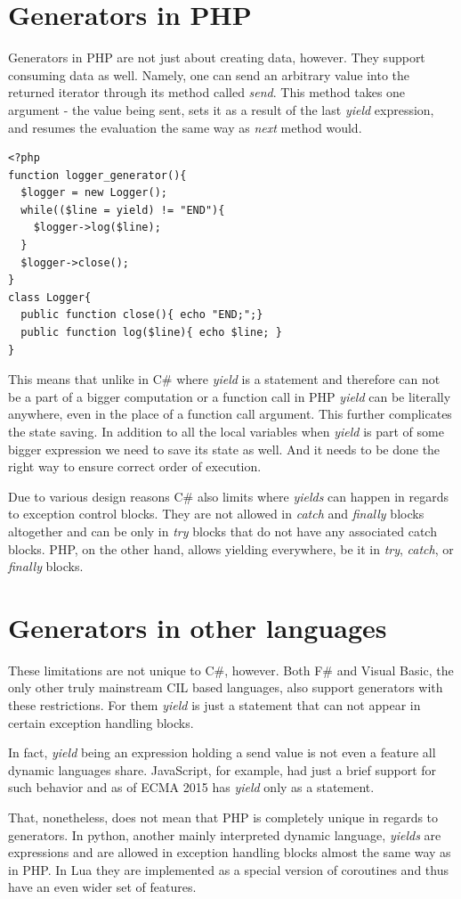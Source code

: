 \section{Generators in PHP}

Generators in PHP are not just about creating data, however. They support consuming data as well. Namely, one can send an arbitrary value into the returned iterator through its method called \emph{send}. This method takes one argument - the value being sent, sets it as a result of the last \emph{yield} expression, and resumes the evaluation the same way as \emph{next} method would.

\begin{verbatim}
<?php
function logger_generator(){
  $logger = new Logger();
  while(($line = yield) != "END"){
    $logger->log($line);
  }
  $logger->close();
}
class Logger{
  public function close(){ echo "END;";}
  public function log($line){ echo $line; }
}
\end{verbatim}

This means that unlike in C\# where \emph{yield} is a statement and therefore can not be a part of a bigger computation or a function call in PHP \emph{yield} can be literally anywhere, even in the place of a function call argument. This further complicates the state saving. In addition to all the local variables when \emph{yield} is part of some bigger expression we need to save its state as well. And it needs to be done the right way to ensure correct order of execution.

Due to various design reasons C\# also limits where \emph{yields} can happen in regards to exception control blocks. They are not allowed in \emph{catch} and \emph{finally} blocks altogether and can be only in \emph{try} blocks that do not have any associated catch blocks. PHP, on the other hand, allows yielding everywhere, be it in \emph{try}, \emph{catch}, or \emph{finally} blocks.

\section{Generators in other languages}

These limitations are not unique to C\#, however. Both F\# and Visual Basic, the only other truly mainstream CIL based languages, also support generators with these restrictions. For them \emph{yield} is just a statement that can not appear in certain exception handling blocks.

In fact, \emph{yield} being an expression holding a send value is not even a feature all dynamic languages share. JavaScript, for example, had just a brief support for such behavior and as of ECMA 2015 has \emph{yield} only as a statement.

That, nonetheless, does not mean that PHP is completely unique in regards to generators. In python, another mainly interpreted dynamic language, \emph{yields} are expressions and are allowed in exception handling blocks almost the same way as in PHP. In Lua they are implemented as a special version of coroutines and thus have an even wider set of features.




